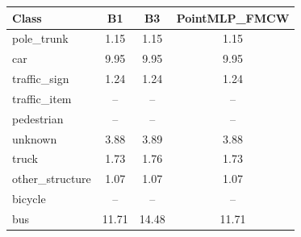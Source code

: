 \begin{tabular}{lccc}
\toprule
Class & B1 & B3 & PointMLP\_FMCW \\
\midrule
pole\_trunk & 1.15 & 1.15 & 1.15 \\
car & 9.95 & 9.95 & 9.95 \\
traffic\_sign & 1.24 & 1.24 & 1.24 \\
traffic\_item & -- & -- & -- \\
pedestrian & -- & -- & -- \\
unknown & 3.88 & 3.89 & 3.88 \\
truck & 1.73 & 1.76 & 1.73 \\
other\_structure & 1.07 & 1.07 & 1.07 \\
bicycle & -- & -- & -- \\
bus & 11.71 & 14.48 & 11.71 \\
\bottomrule
\end{tabular}

